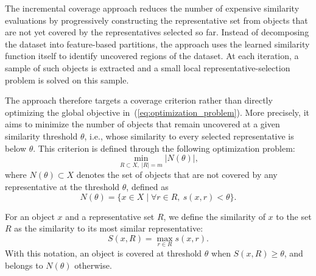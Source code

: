 \documentclass{ieeeaccess}
\newcommand{\toblack}{\color{black}}
\newcommand{\toblue}{\color{blue}}
\newcommand{\ga}[1]{{\toblue [{\bfseries Gillian}: {\itshape #1}] \toblack}}
\newcommand{\representativeamount}{m}
\newcommand{\threshold}{\theta}
\newcommand{\inclusion}{IC\xspace}
\begin{document}
The incremental coverage approach reduces the number of expensive similarity evaluations by progressively constructing the representative set from objects that are not yet covered by the representatives selected so far. Instead of decomposing the dataset into feature-based partitions, the approach uses the learned similarity function itself to identify uncovered regions of the dataset. At each iteration, a sample of such objects is extracted and a small local representative-selection problem is solved on this sample.

The approach therefore targets a coverage criterion rather than directly optimizing the global objective in~(\ref{eq:optimization_problem}). More precisely, it aims to minimize the number of objects that remain
uncovered at a given similarity threshold $\threshold$, i.e., whose similarity to every selected representative is below $\threshold$. This criterion is defined through the following optimization problem:
\begin{equation}
    \min_{R \subset X,\ |R|=\representativeamount}
    |N(\threshold)|,
    \label{eq:above-threshold-metric}
\end{equation}
where $N(\threshold) \subset X$ denotes the set of objects that are not covered by any representative at the threshold $\threshold$, defined as
\begin{equation}
    N(\threshold) =
    \{x \in X \mid \forall r \in R,\ s(x,r) < \threshold\}.
    \label{eq:n-theta}
\end{equation}

For an object $x$ and a representative set $R$, we define the similarity of $x$ to the set $R$ as the similarity to its most similar representative:
\begin{equation}
    S(x,R) = \max_{r \in R} s(x,r).
    \label{eq:set_similarity}
\end{equation}
With this notation, an object is covered at threshold $\threshold$ when $S(x,R) \geq \threshold$, and belongs to $N(\threshold)$ otherwise.

\end{document}
